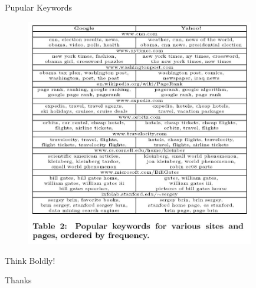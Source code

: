 \documentclass{beamer}
\begin{document}
    \begin{frame}[plain]{Pupular Keywords}
        \begin{figure}
        \includegraphics[width=100mm]{t2}
        \end{figure}
    \end{frame}

    \begin{frame}{Think Boldly!}
        \begin{center}
        \huge{Thanks ~}
        \end{center}
    \end{frame}
\end{document}
